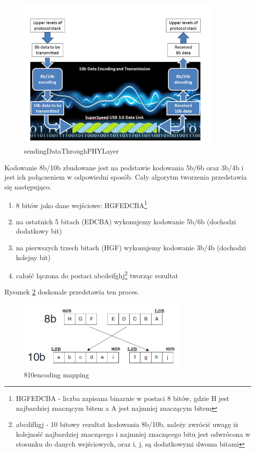 \documentclass{BscUS}
\begin{document}
\begin{figure}[H]
\centering
\includegraphics[width=0.9\textwidth]{./img/SendingData}
\caption{sendingDataThroughPHYLayer}
\label{fig:sendingDataThroughPHYLayer}
\end{figure}
Kodowanie 8b/10b zbudowane jest na podstawie kodowania 5b/6b oraz 3b/4b i jest ich połączeniem w odpowiedni sposób. Cały algorytm tworzenia przedstawia się następująco.
\begin{enumerate}
\item 8 bitów jako dane wejściowe: HGFEDCBA\footnote{HGFEDCBA - liczba zapisana binarnie w postaci 8 bitów, gdzie H jest najbardziej znaczącym bitem a A jest najmniej znaczącym bitem}
\item na ostatnich 5 bitach (EDCBA) wykonujemy kodowanie 5b/6b (dochodzi dodatkowy bit)
\item na pierwszych trzech bitach (HGF) wykonujemy kodowanie 3b/4b (dochodzi kolejny bit)
\item całość łączona do postaci abcdeifghj\footnote{abcdifhgj - 10 bitowy rezultat kodowania 8b/10b, należy zwrócić uwagę iż kolejność najbardziej znaczącego i najmniej znaczącego bitu jest odwrócona w stosunku do danych wejściowych, oraz i, j, są dodatkowymi dwoma bitami} tworząc rezultat
\end{enumerate}
Rysunek \ref{fig:810mapping} doskonale przedstawia ten proces.
\begin{figure}[H]
\centering
\includegraphics[width=0.75\textwidth]{./img/mapping810}
\caption{810encoding mapping}
\label{fig:810mapping}
\end{figure}
\end{document}
